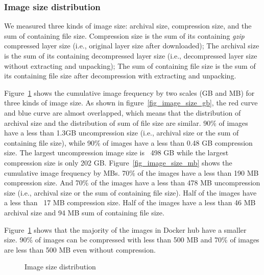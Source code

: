 \subsubsection{Image size distribution}
\label{sec:image-size}
We measured three kinds of image size: archival size, compression size, and the sum of containing file size. Compression size is the sum of its containing \textit{gzip} compressed layer size (i.e., original layer size after downloaded); The archival size is the sum of its containing decompressed layer size (i.e., decompressed layer size without extracting and unpacking); The sum of containing file size is the sum of its containing file size after decompression with extracting and unpacking.

Figure~\ref{fig-image-size} shows the cumulative image frequency by two scales (GB and MB) for three kinds of image size.
As shown in figure~\ref{fig_image_size_gb}, the red curve and blue curve are almost overlapped, which means that the distribution of archival size and the distribution of sum of file size are similar. 90\% of images have a less than 1.3GB uncompression size (i.e., archival size or the sum of containing file size), while 90\% of images have a less than 0.48 GB compression size. The largest uncompression image size is ~498 GB while the largest compression size is only 202 GB.
Figure~\ref{fig_image_size_mb} shows the cumulative image frequency by MBs. 70\% of the images have a less than 190 MB compression size. And 70\% of the images have a less than 478 MB uncompression size (i.e., archival size or the sum of containing file size). Half of the images have a less than ~17 MB compression size. Half of the images have a less than 46 MB archival size and 94 MB sum of containing file size.

Figure~\ref{fig-image-size} shows that the majority of the images in Docker hub have a smaller size. 90\% of images can be compressed with less than 500 MB and 70\% of images are less than 500 MB even without compression. 

\begin{figure}[!t]
	\centering
	\caption{Image size distribution}
	\label{fig-image-size}
\end{figure}

